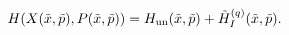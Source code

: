 \begin{equation}
\label{Eq:tilde-H}
H(X(\tilde x,\tilde p),P(\tilde x,\tilde p))=H_{\rm un}(\tilde x,\tilde p)
+\tilde H^{(q)}_I (\tilde x,\tilde p).
\end{equation}

